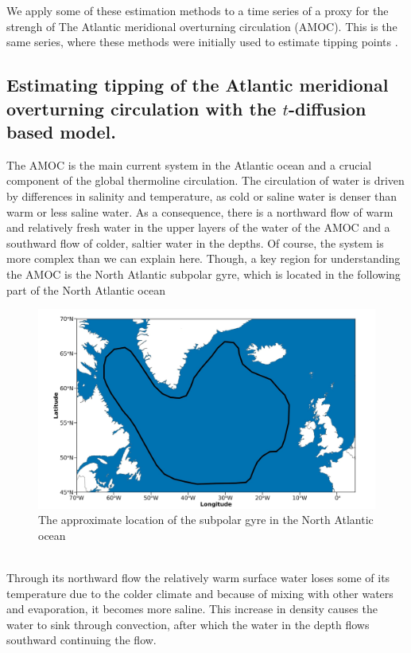We apply some of these estimation methods to a time series of a proxy for the strengh of The Atlantic meridional overturning circulation (AMOC). This is the same series,  where these methods were initially used to estimate tipping points \cite{Ditlevsen2023}.
\subsection{Estimating tipping of the Atlantic meridional overturning circulation with the \texorpdfstring{$t$}{t}-diffusion based model.}
The AMOC is the main current system in the Atlantic ocean and a crucial component of the global thermoline circulation. The circulation of water is driven by differences in salinity and temperature, as cold or saline water is denser than warm or less saline water. As a consequence, there is a northward flow of warm and relatively fresh water in the upper layers of the water of the AMOC and a southward flow of colder, saltier water in the depths. Of course, the system is more complex than we can explain here. Though, a key region for understanding the AMOC is the North Atlantic subpolar gyre, which is located in the following part of the North Atlantic ocean
\begin{figure}[h!]
    \begin{center}
        \includegraphics[scale = .175]{figures/NorthAtlanticOcean.jpeg}
    \end{center}
    \caption{The approximate location of the subpolar gyre in the North Atlantic ocean}
    \label{figure:subpolarGyre}
\end{figure}\\
Through its northward flow the relatively warm surface water loses some of its temperature due to the colder climate and because of mixing with other waters and evaporation, it becomes more saline. This increase in density causes the water to sink through convection, after which the water in the depth flows southward continuing the flow. 

